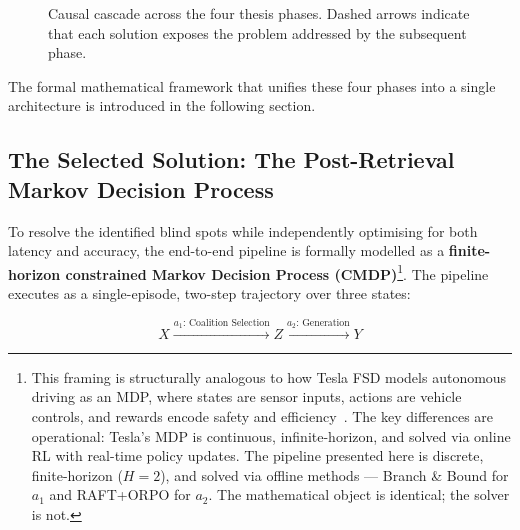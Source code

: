 \begin{figure}[H]
\caption{Causal cascade across the four thesis phases. Dashed arrows 
indicate that each solution exposes the problem addressed by the 
subsequent phase.}
\label{fig:cascade}
\end{figure}

The formal mathematical framework that unifies these four phases into a single architecture is introduced in the following section.



\subsection{The Selected Solution: The Post-Retrieval Markov Decision Process}
\label{subsec:markov-chain}

To resolve the identified blind spots while independently optimising for both latency and accuracy, the end-to-end pipeline is formally modelled as a \textbf{finite-horizon constrained Markov Decision Process (CMDP)}\cite{markov, markov2}\footnote{This framing is structurally analogous to how Tesla FSD models autonomous driving as an MDP, where states are sensor inputs, actions are vehicle controls, and rewards encode safety and efficiency~\cite{tesla_fsd}. The key differences are operational: Tesla's MDP is continuous, infinite-horizon, and solved via online RL with real-time policy updates. The pipeline presented here is discrete, finite-horizon ($H=2$), and solved via offline methods — Branch \& Bound for $a_1$ and RAFT+ORPO for $a_2$. The mathematical object is identical; the solver is not.}. The pipeline executes as a single-episode, two-step trajectory over three states:

\begin{equation}
  X \xrightarrow{a_1:\,\text{Coalition Selection}} Z \xrightarrow{a_2:\,\text{Generation}} Y
\end{equation}

